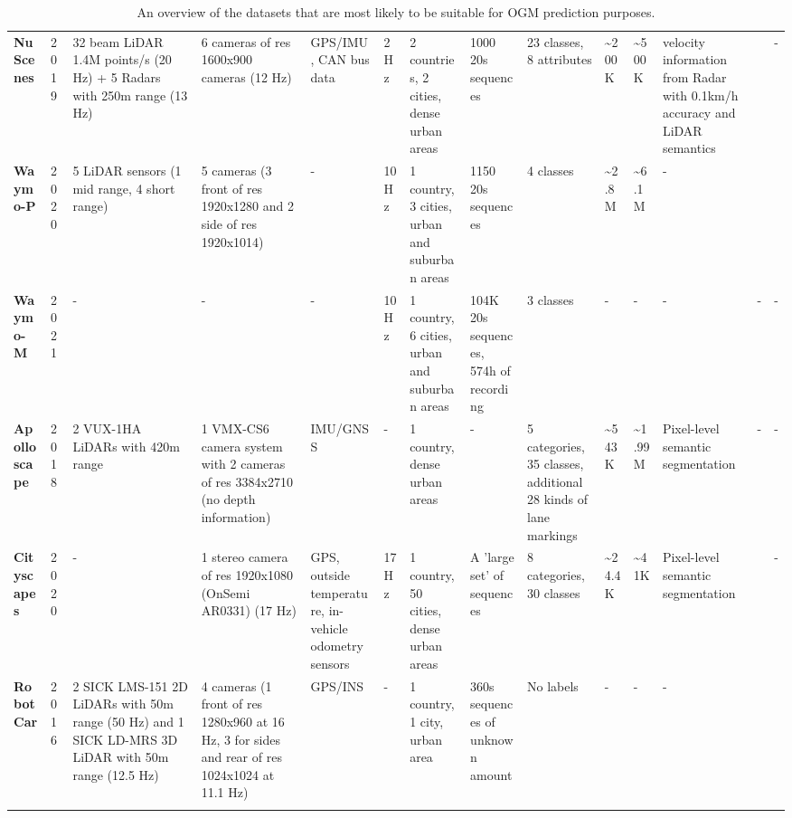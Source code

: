 {\begin{landscape}
\begin{longtable}{m{4em}m{2em}m{7em}m{7em}m{5em}m{2em}m{5em}m{7em}m{4em}m{2em}m{2em}m{5em}m{1em}m{1em}}
			\textbf{NuScenes \cite{caesar2020nuscenes}} & 2019 & 32 beam LiDAR 1.4M points/s (20 Hz) + 5 Radars with 250m range (13 Hz) & 6 cameras of res 1600x900 cameras (12 Hz) & GPS/IMU, CAN bus data & 2 Hz & 2 countries, 2 cities, dense urban areas & 1000 20s sequences & 23 classes, 8 attributes & \textasciitilde{}200K & \textasciitilde{}500K & velocity information from Radar with 0.1km/h accuracy and LiDAR semantics & \cite{roddick2020predicting} \cite{loukkal2021driving} & - \\
			\textbf{Waymo-P \cite{sun2020scalability}} & 2020 & 5 LiDAR sensors (1 mid range, 4 short range) & 5 cameras (3 front of res 1920x1280 and 2 side of res 1920x1014) & - & 10 Hz & 1 country, 3 cities, urban and suburban areas & 1150 20s sequences & 4 classes & \textasciitilde{}2.8M & \textasciitilde{}6.1M & - & \cite{lange2020attention} \cite{toyungyernsub2020double} & \cite{lange2020attention} \cite{toyungyernsub2020double} \\
			\textbf{Waymo-M \cite{ettinger2021large}} & 2021 & - & - & - & 10 Hz & 1 country, 6 cities, urban and suburban areas & 104K 20s sequences, 574h of recording & 3 classes & - & - & - & - & - \\
			\textbf{Apolloscape \cite{huang2019apolloscape}} & 2018 & 2 VUX-1HA LiDARs with 420m range & 1 VMX-CS6 camera system with 2 cameras of res 3384x2710 (no depth information) & IMU/GNSS & - & 1 country, dense urban areas & - & 5 categories, 35 classes, additional 28 kinds of lane markings & \textasciitilde{}543K & \textasciitilde{}1.99M & Pixel-level semantic segmentation & - & - \\
			\textbf{Cityscapes \cite{cordts2016cityscapes}} & 2020 & - & 1 stereo camera of res 1920x1080 (OnSemi AR0331) (17 Hz) & GPS, outside temperature, in-vehicle odometry sensors & 17 Hz & 1 country, 50 cities, dense urban areas & A 'large set' of sequences & 8 categories, 30 classes & \textasciitilde{}24.4K & \textasciitilde{}41K & Pixel-level semantic segmentation & \cite{hehn2021fast} & - \\
			\textbf{RobotCar \cite{robotcardatasetijrr}} & 2016 & 2 SICK LMS-151 2D LiDARs with 50m range (50 Hz) and 1 SICK LD-MRS 3D LiDAR with 50m range (12.5 Hz) & 4 cameras (1 front of res 1280x960 at 16 Hz, 3 for sides and rear of res 1024x1024 at 11.1 Hz) & GPS/INS & - & 1 country, 1 city, urban area & 360s sequences of unknown amount & No labels & - & - & - & \cite{dequaire2018deep} \cite{wang2020l2r} & \cite{dequaire2018deep} \\
			\bottomrule
		\caption{An overview of the datasets that are most likely to be suitable for \gls{OGM} prediction purposes.}
		\label{tab:datasets_overview}	
		\end{longtable}	
	\end{landscape}
}

